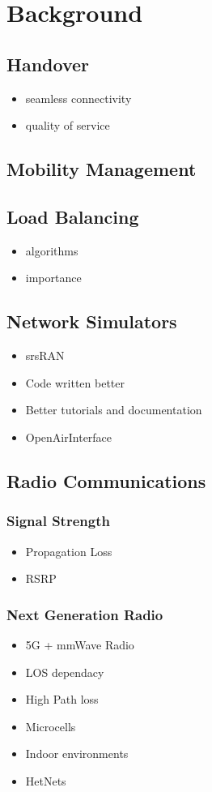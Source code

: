 \chapter{Background}
\section{Handover}
\begin{itemize}
    \item seamless connectivity
    \item quality of service
\end{itemize}
\section{Mobility Management}
\section{Load Balancing}
\begin{itemize}
    \item algorithms
    \item importance
\end{itemize}
\section{Network Simulators}
\begin{itemize}
    \setlength{\itemindent}{0em}
    \item srsRAN
    \setlength{\itemindent}{2em}
    \item Code written better
    \item Better tutorials and documentation
    \setlength{\itemindent}{0em}
    \item OpenAirInterface
\end{itemize}
\section{Radio Communications}
\subsection{Signal Strength}
\begin{itemize}
    \item Propagation Loss
    \item RSRP
\end{itemize}
\subsection{Next Generation Radio}
\begin{itemize}
    \item 5G + mmWave Radio
    \item LOS dependacy
    \item High Path loss
    \item Microcells
    \item Indoor environments
    \item HetNets
\end{itemize}
